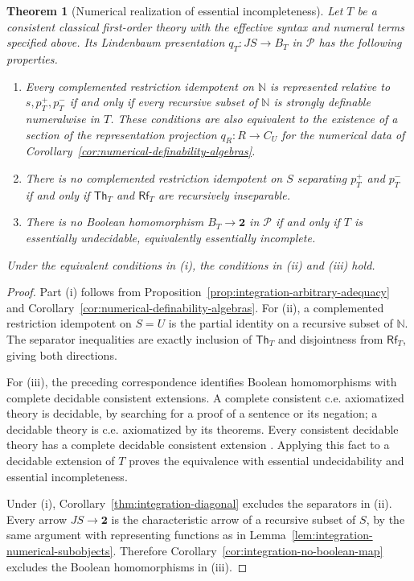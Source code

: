 \documentclass[11pt]{article}
\newtheorem{theorem}{Theorem}[section]
\theoremstyle{definition}
\theoremstyle{remark}
\begin{document}
\begin{theorem}[Numerical realization of essential incompleteness]
\label{thm:integration-essential-equivalence}
Let $T$ be a consistent classical first-order theory with the
effective syntax and numeral terms specified above. Its
Lindenbaum presentation $q_T:JS\to B_T$ in $\mathcal P$ has the
following properties.
\begin{enumerate}[label=\textup{(\roman*)}]
\item Every complemented restriction idempotent on $\mathbb N$ is
represented relative to $s,p_T^+,p_T^-$ if and only if every
recursive subset of $\mathbb N$ is strongly definable numeralwise
in $T$. These conditions are also equivalent to the existence of a
section of the representation projection $q_R:R\to C_U$
for the numerical data of
Corollary~\ref{cor:numerical-definability-algebras}.
\item There is no complemented restriction idempotent on $S$
separating $p_T^+$ and $p_T^-$ if and only if
$\mathsf{Th}_T$ and $\mathsf{Rf}_T$ are recursively inseparable.
\item There is no Boolean homomorphism $B_T\to\mathbf2$ in
$\mathcal P$ if and only if $T$ is essentially undecidable,
equivalently essentially incomplete.
\end{enumerate}
Under the equivalent conditions in \textup{(i)}, the conditions
in \textup{(ii)} and \textup{(iii)} hold.
\end{theorem}
\begin{proof}
Part (i) follows from Proposition~\ref{prop:integration-arbitrary-adequacy}
and Corollary~\ref{cor:numerical-definability-algebras}.
For (ii), a complemented restriction idempotent on $S=U$ is the
partial identity on a recursive subset of $\mathbb N$. The separator
inequalities are exactly inclusion of $\mathsf{Th}_T$ and
disjointness from $\mathsf{Rf}_T$, giving both directions.

For (iii), the preceding correspondence identifies Boolean
homomorphisms with complete decidable consistent extensions.
A complete consistent c.e. axiomatized theory is decidable, by
searching for a proof of a sentence or its negation; a decidable
theory is c.e. axiomatized by its theorems. Every consistent
decidable theory has a complete decidable consistent extension
\cite[Section~2.7, Exercise~2.50]{Mendelson}.
Applying this fact to a decidable extension of $T$ proves the
equivalence with essential undecidability and essential incompleteness.

Under (i), Corollary~\ref{thm:integration-diagonal} excludes the
separators in (ii). Every arrow $JS\to\mathbf2$ is the
characteristic arrow of a recursive subset of $S$, by the same argument with representing functions as in
Lemma~\ref{lem:integration-numerical-subobjects}. Therefore
Corollary~\ref{cor:integration-no-boolean-map} excludes the Boolean
homomorphisms in (iii).
\end{proof}
\end{document}
